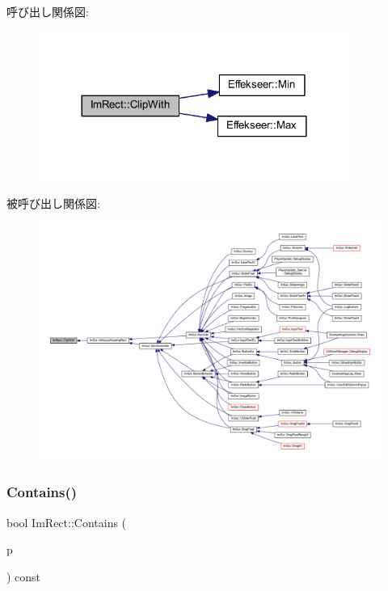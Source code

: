 呼び出し関係図\+:\nopagebreak
\begin{figure}[H]
\begin{center}
\leavevmode
\includegraphics[width=288pt]{struct_im_rect_a5e220ababe2fa079638aab8f4b0b8ace_cgraph}
\end{center}
\end{figure}
被呼び出し関係図\+:\nopagebreak
\begin{figure}[H]
\begin{center}
\leavevmode
\includegraphics[width=350pt]{struct_im_rect_a5e220ababe2fa079638aab8f4b0b8ace_icgraph}
\end{center}
\end{figure}
\mbox{\label{struct_im_rect_ac583156fd0e9306181fff5d120b262ea}} 
\subsubsection{\texorpdfstring{Contains()}{Contains()}\hspace{0.1cm}{\footnotesize\ttfamily [1/2]}}
{\footnotesize\ttfamily bool Im\+Rect\+::\+Contains (\begin{DoxyParamCaption}\item[{const \mbox{\hyperlink{struct_im_vec2}{Im\+Vec2}} \&}]{p }\end{DoxyParamCaption}) const\hspace{0.3cm}{\ttfamily [inline]}}



